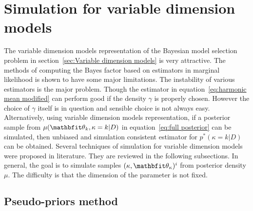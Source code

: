 \section{Simulation for variable dimension models}
\label{sec:Simulation for variable dimension models}

The variable dimension models representation of the Bayesian model selection
problem in section~\ref{sec:Variable dimension models} is very attractive. The
methods of computing the Bayes factor based on estimators in marginal
likelihood is shown to have some major limitations. The instability of various
estimators is the major problem. Though the estimator in
equation~\eqref{eq:harmonic mean modified} can perform good if the density
$\gamma$ is properly chosen. However the choice of $\gamma$ itself is in
question and sensible choice is not always easy. Alternatively, using variable
dimension models representation, if a posterior sample from
$\mu(\bth_k,\kappa=k|D)$ in equation~\eqref{eq:full posterior} can be
simulated, then unbiased and simulation consistent estimator for
$p^*(\kappa=k|D)$ can be obtained. Several techniques of simulation for
variable dimension models were proposed in literature. They are reviewed in
the following subsections. In general, the goal is to simulate samples
$(\kappa, \bth_{\kappa})^i$ from posterior density $\mu$. The difficulty is
that the dimension of the parameter is not fixed.

\subsection{Pseudo-priors method}
\label{sub:Pseudo-priors method}

